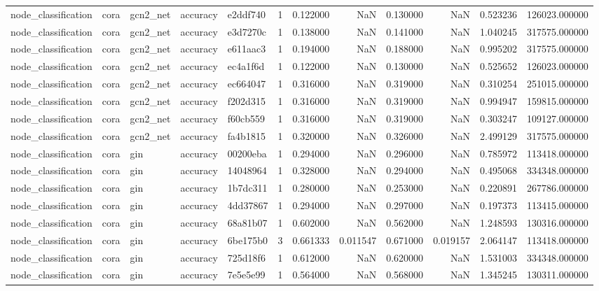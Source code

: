 \begin{tabular}{lllllrrrrrrr}
node_classification & cora & gcn2_net & accuracy & e2ddf740 & 1 & 0.122000 & NaN & 0.130000 & NaN & 0.523236 & 126023.000000 \\
node_classification & cora & gcn2_net & accuracy & e3d7270c & 1 & 0.138000 & NaN & 0.141000 & NaN & 1.040245 & 317575.000000 \\
node_classification & cora & gcn2_net & accuracy & e611aac3 & 1 & 0.194000 & NaN & 0.188000 & NaN & 0.995202 & 317575.000000 \\
node_classification & cora & gcn2_net & accuracy & ec4a1f6d & 1 & 0.122000 & NaN & 0.130000 & NaN & 0.525652 & 126023.000000 \\
node_classification & cora & gcn2_net & accuracy & ec664047 & 1 & 0.316000 & NaN & 0.319000 & NaN & 0.310254 & 251015.000000 \\
node_classification & cora & gcn2_net & accuracy & f202d315 & 1 & 0.316000 & NaN & 0.319000 & NaN & 0.994947 & 159815.000000 \\
node_classification & cora & gcn2_net & accuracy & f60cb559 & 1 & 0.316000 & NaN & 0.319000 & NaN & 0.303247 & 109127.000000 \\
node_classification & cora & gcn2_net & accuracy & fa4b1815 & 1 & 0.320000 & NaN & 0.326000 & NaN & 2.499129 & 317575.000000 \\
node_classification & cora & gin & accuracy & 00200eba & 1 & 0.294000 & NaN & 0.296000 & NaN & 0.785972 & 113418.000000 \\
node_classification & cora & gin & accuracy & 14048964 & 1 & 0.328000 & NaN & 0.294000 & NaN & 0.495068 & 334348.000000 \\
node_classification & cora & gin & accuracy & 1b7dc311 & 1 & 0.280000 & NaN & 0.253000 & NaN & 0.220891 & 267786.000000 \\
node_classification & cora & gin & accuracy & 4dd37867 & 1 & 0.294000 & NaN & 0.297000 & NaN & 0.197373 & 113415.000000 \\
node_classification & cora & gin & accuracy & 68a81b07 & 1 & 0.602000 & NaN & 0.562000 & NaN & 1.248593 & 130316.000000 \\
node_classification & cora & gin & accuracy & 6be175b0 & 3 & 0.661333 & 0.011547 & 0.671000 & 0.019157 & 2.064147 & 113418.000000 \\
node_classification & cora & gin & accuracy & 725d18f6 & 1 & 0.612000 & NaN & 0.620000 & NaN & 1.531003 & 334348.000000 \\
node_classification & cora & gin & accuracy & 7e5e5e99 & 1 & 0.564000 & NaN & 0.568000 & NaN & 1.345245 & 130311.000000 \\

\end{tabular}
